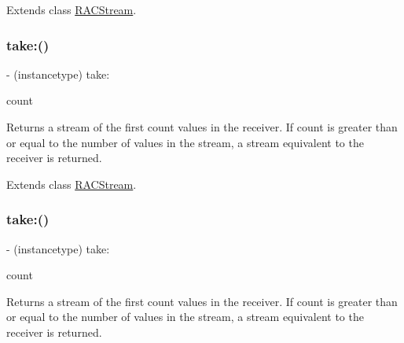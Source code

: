 Extends class \mbox{\hyperlink{interface_r_a_c_stream_af0264b38dc4acd9334d2e42b1ce21b05}{R\+A\+C\+Stream}}.

\mbox{\label{category_r_a_c_stream_07_operations_08_af0264b38dc4acd9334d2e42b1ce21b05}} 
\subsubsection{\texorpdfstring{take\+:()}{take:()}\hspace{0.1cm}{\footnotesize\ttfamily [2/3]}}
{\footnotesize\ttfamily -\/ (instancetype) take\+: \begin{DoxyParamCaption}\item[{(N\+S\+U\+Integer)}]{count }\end{DoxyParamCaption}}

Returns a stream of the first {\ttfamily count} values in the receiver. If {\ttfamily count} is greater than or equal to the number of values in the stream, a stream equivalent to the receiver is returned. 

Extends class \mbox{\hyperlink{interface_r_a_c_stream_af0264b38dc4acd9334d2e42b1ce21b05}{R\+A\+C\+Stream}}.

\mbox{\label{category_r_a_c_stream_07_operations_08_af0264b38dc4acd9334d2e42b1ce21b05}} 
\subsubsection{\texorpdfstring{take\+:()}{take:()}\hspace{0.1cm}{\footnotesize\ttfamily [3/3]}}
{\footnotesize\ttfamily -\/ (instancetype) take\+: \begin{DoxyParamCaption}\item[{(N\+S\+U\+Integer)}]{count }\end{DoxyParamCaption}}

Returns a stream of the first {\ttfamily count} values in the receiver. If {\ttfamily count} is greater than or equal to the number of values in the stream, a stream equivalent to the receiver is returned. 

